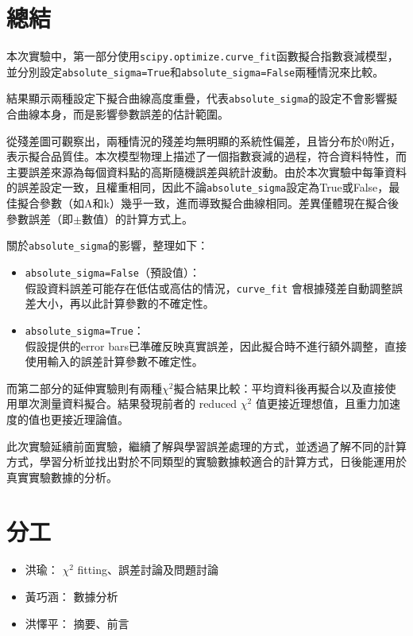 \documentclass[12pt,a4paper]{article}
\begin{document}
\begin{CJK}{UTF8}{bkai}
\section{總結}
\hfill

本次實驗中，第一部分使用\texttt{scipy.optimize.curve\_fit}函數擬合指數衰減模型，並分別設定\texttt{absolute\_sigma=True}和\texttt{absolute\_sigma=False}兩種情況來比較。

結果顯示兩種設定下擬合曲線高度重疊，代表\texttt{absolute\_sigma}的設定不會影響擬合曲線本身，而是影響參數誤差的估計範圍。

從殘差圖可觀察出，兩種情況的殘差均無明顯的系統性偏差，且皆分布於0附近，表示擬合品質佳。本次模型物理上描述了一個指數衰減的過程，符合資料特性，而主要誤差來源為每個資料點的高斯隨機誤差與統計波動。由於本次實驗中每筆資料的誤差設定一致，且權重相同，因此不論\texttt{absolute\_sigma}設定為True或False，最佳擬合參數（如A和k）幾乎一致，進而導致擬合曲線相同。差異僅體現在擬合後參數誤差（即$\pm$數值）的計算方式上。

關於\texttt{absolute\_sigma}的影響，整理如下：
\begin{itemize}
    \item \texttt{absolute\_sigma=False}（預設值）：\\假設資料誤差可能存在低估或高估的情況，\texttt{curve\_fit} 會根據殘差自動調整誤差大小，再以此計算參數的不確定性。
    \item \texttt{absolute\_sigma=True}：\\假設提供的error bars已準確反映真實誤差，因此擬合時不進行額外調整，直接使用輸入的誤差計算參數不確定性。
\end{itemize}

而第二部分的延伸實驗則有兩種$\chi^{2}$擬合結果比較：平均資料後再擬合以及直接使用單次測量資料擬合。結果發現前者的 reduced $\chi^{2}$ 值更接近理想值，且重力加速度的值也更接近理論值。

此次實驗延續前面實驗，繼續了解與學習誤差處理的方式，並透過了解不同的計算方式，學習分析並找出對於不同類型的實驗數據較適合的計算方式，日後能運用於真實實驗數據的分析。


\section{分工}
\begin{itemize}
    \item 洪瑜： $\chi^2$ fitting、誤差討論及問題討論
    \item 黃巧涵： 數據分析
    \item 洪懌平： 摘要、前言
\end{itemize}

\end{CJK}
\end{document}
